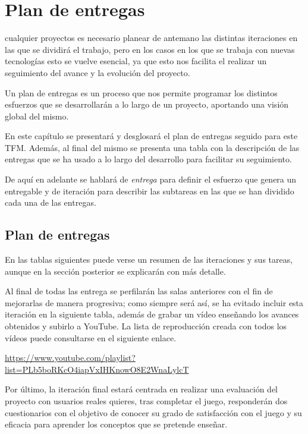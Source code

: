 \chapter{Plan de entregas}
\label{chap:plan_entregas}

 cualquier proyectos es necesario planear de antemano las distintas iteraciones en las que se dividirá el trabajo, pero en los casos en los que se trabaja con nuevas tecnologías esto se vuelve esencial, ya que esto nos facilita el realizar un seguimiento del avance y la evolución del proyecto.

Un plan de entregas es un proceso que nos permite programar los distintos esfuerzos que se desarrollarán a lo largo de un proyecto, aportando  una visión global del mismo.

En este capítulo se presentará y desglosará el plan de entregas seguido para este \acs{TFM}. Además, al final del mismo se presenta una tabla con la descripción de las entregas que se ha usado a lo largo del desarrollo para facilitar su seguimiento.

De aquí en adelante se hablará de \textit{entrega} para definir el esfuerzo que genera un entregable y de iteración para describir las subtareas en las que se han dividido cada una de las entregas.

\section{Plan de entregas}

En las tablas siguientes puede verse un resumen de las iteraciones y sus tareas, aunque en la sección posterior se explicarán con más detalle.

Al final de todas las entrega se perfilarán las salas anteriores con el fin de mejorarlas de manera progresiva; como siempre será así, se ha evitado incluir esta iteración en la siguiente tabla, además de grabar un vídeo enseñando los avances obtenidos y subirlo a YouTube. La lista de reproducción creada con todos los vídeos puede consultarse en el siguiente enlace.

\begin{center}
    \url{https://www.youtube.com/playlist?list=PLb5boRKcO4iapVxIHKnowO8E2WnaLylcT}
\end{center}

Por último, la iteración final estará centrada en realizar una evaluación del proyecto con usuarios reales quieres, tras completar el juego, responderán dos cuestionarios con el objetivo de conocer su grado de satisfacción con el juego y su eficacia para aprender los conceptos que se pretende enseñar.

